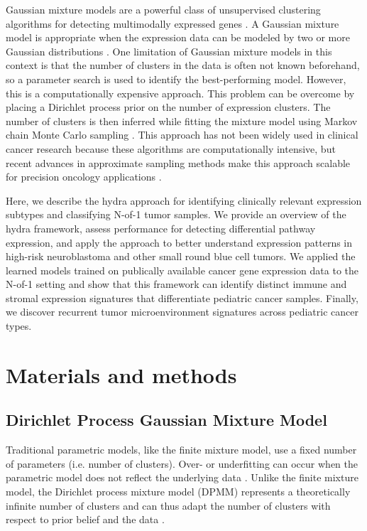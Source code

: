 \documentclass[10pt,letterpaper]{article}
\begin{document}
Gaussian mixture models are a powerful class of unsupervised clustering algorithms for detecting multimodally expressed genes \cite{ghoshMixtureModelsAssessing2004,dahlModelBasedClusteringExpression2006,kimVariableSelectionClustering2006}. A Gaussian mixture model is appropriate when the expression data can be modeled by two or more Gaussian distributions \cite{gelman2013bayesian}. One limitation of Gaussian mixture models in this context is that the number of clusters in the data is often not known beforehand, so a parameter search is used to identify the best-performing model. However, this is a computationally expensive approach. This problem can be overcome by placing a Dirichlet process prior on the number of expression clusters. The number of clusters is then inferred while fitting the mixture model using Markov chain Monte Carlo sampling \cite{gelman2013bayesian}. This approach has not been widely used in clinical cancer research because these algorithms are computationally intensive, but recent advances in approximate sampling methods make this approach scalable for precision oncology applications \cite{thallBayesianNonparametricStatistics2017}.

Here, we describe the hydra approach for identifying clinically relevant expression subtypes and classifying N-of-1 tumor samples. We provide an overview of the hydra framework, assess performance for detecting differential pathway expression, and apply the approach to better understand expression patterns in high-risk neuroblastoma and other small round blue cell tumors. We applied the learned models trained on publically available cancer gene expression data to the N-of-1 setting and show that this framework can identify distinct immune and stromal expression signatures that differentiate pediatric cancer samples. Finally, we discover recurrent tumor microenvironment signatures across pediatric cancer types.


\section*{Materials and methods}
\subsection{Dirichlet Process Gaussian Mixture Model}
Traditional parametric models, like the finite mixture model, use a fixed number of parameters (i.e. number of clusters). Over- or underfitting can occur when the parametric model does not reflect the underlying data \cite{teh2010dirichlet}. Unlike the finite mixture model, the Dirichlet process mixture model (DPMM) represents a theoretically infinite number of clusters and can thus adapt the number of clusters with respect to prior belief and the data \cite{gelmanBayesianDataAnalysis2013, antoniakMixturesDirichletProcesses1974}.
\end{document}
